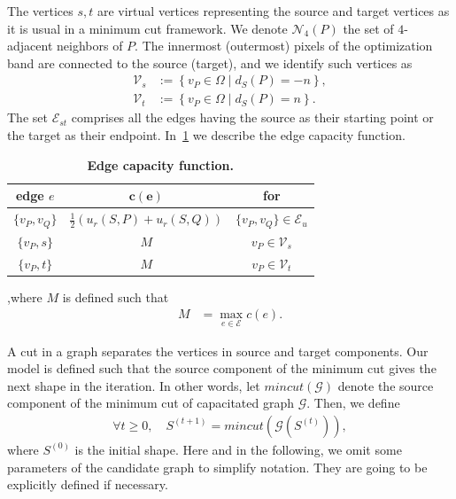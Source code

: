 \documentclass[review]{siamart220329}
\begin{document}
The vertices $s,t$ are virtual vertices representing the source and target vertices as it is usual in a minimum cut framework. We denote $\mathcal{N}_4(P)$ the set of $4$-adjacent neighbors of $P$. The innermost (outermost) pixels of the optimization band are connected to the source (target), and we identify such vertices as
%
%
\begin{align*}
	\mathcal{V}_s &:=\left\{ v_P \in \Omega \; | \; d_{S}(P) = -n \right\}, \\
	\mathcal{V}_t &:=\left\{ v_P \in \Omega \; | \; d_{S}(P) = n \right\}.
\end{align*}
%
%
The set $\mathcal{E}_{st}$ comprises all the edges having the source as their starting point or the target as their endpoint. In~\cref{tab:edge-capacity} we describe the edge capacity function.
%
%
\begin{table}
\footnotesize
	\caption{\textbf{Edge capacity function.}}\label{tab:edge-capacity}
\begin{center}
\begin{tabular}{|c|c|c|}
\hline
\textbf{edge} $e$ & $\mathbf{c(e)}$ & \textbf{for}\\
\hline
$\{v_P, v_Q\}$ & $ \frac{1}{2}\left( u_r(S,P) + u_r(S,Q) \right) $ & $\{v_P,v_Q\} \in \mathcal{E}_{u}$\\
\hline
$\{v_P, s\}$ & $M$ & $v_P \in \mathcal{V}_{s}$ \\
\hline
$\{v_P, t\}$ & $M$ & $v_P \in \mathcal{V}_{t}$ \\
\hline
\end{tabular}
\end{center}
,where $M$ is defined such that
\begin{align*}
	M &= \max_{e \in \mathcal{E} }{ c(e) }.
\end{align*}
\end{table}
%
%

A cut in a graph separates the vertices in source and target components. Our model is defined such that the source component of the minimum cut gives the next shape in the iteration. In other words, let $mincut(\mathcal{G})$ denote the source component of the minimum cut of capacitated graph $\mathcal{G}$. Then, we define
%
%
\begin{align}
	\forall t \geq0, \quad S^{(t+1)} = mincut\left( \mathcal{G}(S^{(t)}) \right), 
	\label{eq:no-neighborhood-process}
\end{align}
%
%
where $S^{(0)}$ is the initial shape. Here and in the following, we omit some parameters of the candidate graph to simplify notation. They are going to be explicitly defined if necessary.
\end{document}
